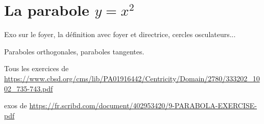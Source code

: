 \begin{exo}
\begin{hint}
\end{hint}
\begin{sol}
\end{sol}
\end{exo}



\begin{exo}
\begin{hint}
\end{hint}
\begin{sol}
\end{sol}
\end{exo}



\begin{exo}
\begin{hint}
\end{hint}
\begin{sol}
\end{sol}
\end{exo}

\section{La parabole $y=x^2$}

Exo sur le foyer, la définition avec foyer et directrice, cercles osculateurs...

Paraboles orthogonales, paraboles tangentes.

Tous les exercices de \url{https://www.cbsd.org/cms/lib/PA01916442/Centricity/Domain/2780/333202_1002_735-743.pdf}

exos de \url{https://fr.scribd.com/document/402953420/9-PARABOLA-EXERCISE-pdf}

\begin{exo}
\begin{hint}
\end{hint}
\begin{sol}
\end{sol}
\end{exo}

\begin{exo}
\begin{hint}
\end{hint}
\begin{sol}
\end{sol}
\end{exo}

\begin{exo}
\begin{hint}
\end{hint}
\begin{sol}
\end{sol}
\end{exo}


\indications
\correction



